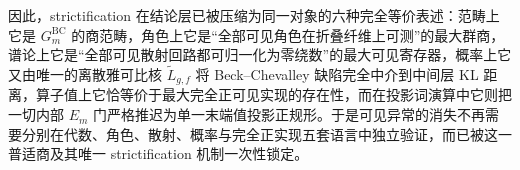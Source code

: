 

\noindent
因此，strictification 在结论层已被压缩为同一对象的六种完全等价表述：范畴上它是 \(G_m^{\mathrm{BC}}\) 的商范畴，角色上它是“全部可见角色在折叠纤维上可测”的最大群商，谱论上它是“全部可见散射回路都可归一化为零绕数”的最大可见寄存器，概率上它又由唯一的离散雅可比核 \(\widetilde L_{g,f}\) 将 Beck--Chevalley 缺陷完全中介到中间层 KL 距离，算子值上它恰等价于最大完全正可见实现的存在性，而在投影词演算中它则把一切内部 \(E_m\) 门严格推迟为单一末端值投影正规形。于是可见异常的消失不再需要分别在代数、角色、散射、概率与完全正实现五套语言中独立验证，而已被这一普适商及其唯一 strictification 机制一次性锁定。

\endinput
